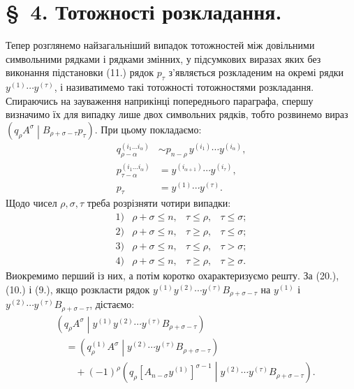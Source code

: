 \documentclass[11pt]{article}
\newcommand{\pair}[2]{\left(#1\middle|#2\right)}
\begin{document}
\section*{\S\ 4. Тотожності розкладання.}

Тепер розглянемо найзагальніший випадок тотожностей між довільними символьними рядками і рядками змінних, у підсумкових виразах яких без виконання підстановки (11.) рядок $p_\tau$ з'являється розкладеним на окремі рядки $y^{(1)}\cdots y^{(\tau)}$, і називатимемо такі тотожності тотожностями розкладання. Спираючись на зауваження наприкінці попереднього параграфа, спершу визначимо їх для випадку лише двох символьних рядків, тобто розвинемо вираз $\pair{q_\rho A^\sigma}{B_{\rho+\sigma-\tau}p_\tau}$. При цьому покладаємо:
\begin{equation}
\begin{aligned}
q_{\rho-\alpha}^{(i_1\ldots i_\alpha)}
&\sim p_{n-\rho}\,y^{(i_1)}\cdots y^{(i_\alpha)},\\
p_{\tau-\alpha}^{(i_1\ldots i_\alpha)}
&=y^{(i_{\alpha+1})}\cdots y^{(i_\tau)},\\
p_\tau&=y^{(1)}\cdots y^{(\tau)}.
\end{aligned}
\tag{22}
\end{equation}
Щодо чисел $\rho,\sigma,\tau$ треба розрізняти чотири випадки:
\[
\begin{array}{llll}
1)&\rho+\sigma\le n,& \tau\le\rho,& \tau\le\sigma;\\[2pt]
2)&\rho+\sigma\le n,& \tau\ge\rho,& \tau\le\sigma;\\[2pt]
3)&\rho+\sigma\le n,& \tau\le\rho,& \tau>\sigma;\\[2pt]
4)&\rho+\sigma\le n,& \tau\ge\rho,& \tau\ge\sigma.
\end{array}
\]
Виокремимо перший із них, а потім коротко охарактеризуємо решту. За (20.), (10.) і (9.), якщо розкласти рядок $y^{(1)}y^{(2)}\cdots y^{(\tau)}B_{\rho+\sigma-\tau}$ на $y^{(1)}$ і $y^{(2)}\cdots y^{(\tau)}B_{\rho+\sigma-\tau}$, дістаємо:
\begin{equation}
\begin{aligned}
&\pair{q_\rho A^\sigma}{y^{(1)}y^{(2)}\cdots y^{(\tau)}
B_{\rho+\sigma-\tau}}\\
&\quad=\pair{q_\rho^{(1)}A^\sigma}
{y^{(2)}\cdots y^{(\tau)}B_{\rho+\sigma-\tau}}\\
&\qquad+(-1)^\rho
\pair{q_\rho[A_{n-\sigma}y^{(1)}]^{\sigma-1}}
{y^{(2)}\cdots y^{(\tau)}B_{\rho+\sigma-\tau}}.
\end{aligned}
\tag{23}
\end{equation}
\end{document}
